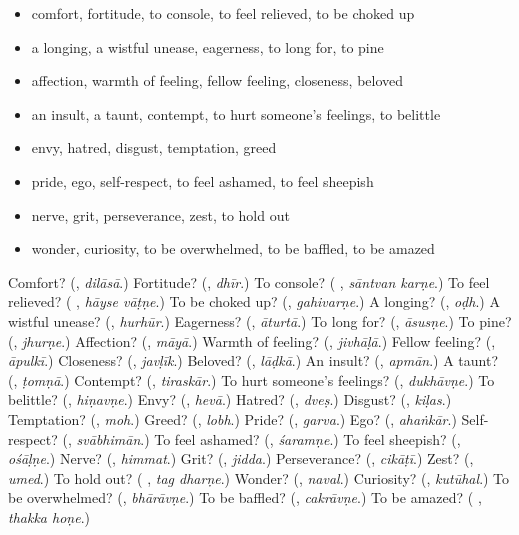 \begin{itemize}
\raggedright
  \item comfort, fortitude, to console, to feel relieved, to be choked up
  \item a longing, a wistful unease, eagerness, to long for, to pine
  \item affection, warmth of feeling, fellow feeling, closeness, beloved
  \item an insult, a taunt, contempt, to hurt someone's feelings, to belittle
  \item envy, hatred, disgust, temptation, greed
  \item pride, ego, self-respect, to feel ashamed, to feel sheepish
  \item nerve, grit, perseverance, zest, to hold out
  \item wonder, curiosity, to be overwhelmed, to be baffled, to be amazed
\end{itemize}

\begin{tcolorbox}[breakable,colback=teal!4,colframe=teal!35!black,title={Before you move on}]
Comfort? (\textbf{}, \emph{dilāsā}.) Fortitude? (\textbf{}, \emph{dhīr}.) To console? (\textbf{ }, \emph{sāntvan karṇe}.) To feel relieved? (\textbf{ }, \emph{hāyse vāṭṇe}.) To be choked up? (\textbf{}, \emph{gahivarṇe}.) A longing? (\textbf{}, \emph{oḍh}.) A wistful unease? (\textbf{}, \emph{hurhūr}.) Eagerness? (\textbf{}, \emph{āturtā}.) To long for? (\textbf{}, \emph{āsusṇe}.) To pine? (\textbf{}, \emph{jhurṇe}.) Affection? (\textbf{}, \emph{māyā}.) Warmth of feeling? (\textbf{}, \emph{jivhāḷā}.) Fellow feeling? (\textbf{}, \emph{āpulkī}.) Closeness? (\textbf{}, \emph{javḷīk}.) Beloved? (\textbf{}, \emph{lāḍkā}.) An insult? (\textbf{}, \emph{apmān}.) A taunt? (\textbf{}, \emph{ṭomṇā}.) Contempt? (\textbf{}, \emph{tiraskār}.) To hurt someone's feelings? (\textbf{}, \emph{dukhāvṇe}.) To belittle? (\textbf{}, \emph{hiṇavṇe}.) Envy? (\textbf{}, \emph{hevā}.) Hatred? (\textbf{}, \emph{dveṣ}.) Disgust? (\textbf{}, \emph{kiḷas}.) Temptation? (\textbf{}, \emph{moh}.) Greed? (\textbf{}, \emph{lobh}.) Pride? (\textbf{}, \emph{garva}.) Ego? (\textbf{}, \emph{ahaṅkār}.) Self-respect? (\textbf{}, \emph{svābhimān}.) To feel ashamed? (\textbf{}, \emph{śaramṇe}.) To feel sheepish? (\textbf{}, \emph{ośāḷṇe}.) Nerve? (\textbf{}, \emph{himmat}.) Grit? (\textbf{}, \emph{jidda}.) Perseverance? (\textbf{}, \emph{cikāṭī}.) Zest? (\textbf{}, \emph{umed}.) To hold out? (\textbf{ }, \emph{tag dharṇe}.) Wonder? (\textbf{}, \emph{naval}.) Curiosity? (\textbf{}, \emph{kutūhal}.) To be overwhelmed? (\textbf{}, \emph{bhārāvṇe}.) To be baffled? (\textbf{}, \emph{cakrāvṇe}.) To be amazed? (\textbf{ }, \emph{thakka hoṇe}.)
\end{tcolorbox}
